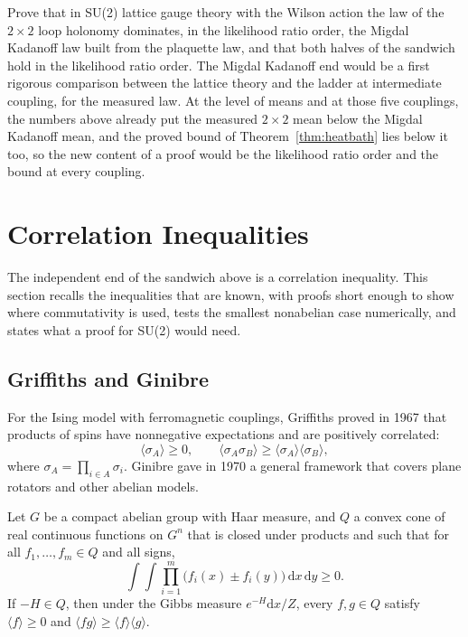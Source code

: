 \begin{problem}\label{op:ineq1}
Prove that in SU(2) lattice gauge theory with the Wilson action the law of the $2\times2$ loop holonomy dominates, in the likelihood ratio order, the Migdal Kadanoff law built from the plaquette law, and that both halves of the sandwich hold in the likelihood ratio order. The Migdal Kadanoff end would be a first rigorous comparison between the lattice theory and the ladder at intermediate coupling, for the measured law. At the level of means and at those five couplings, the numbers above already put the measured $2\times2$ mean below the Migdal Kadanoff mean, and the proved bound of Theorem~\ref{thm:heatbath} lies below it too, so the new content of a proof would be the likelihood ratio order and the bound at every coupling.
\end{problem}

\section{Correlation Inequalities}\label{ch:griffiths}

The independent end of the sandwich above is a correlation inequality. This section recalls the inequalities that are known, with proofs short enough to show where commutativity is used, tests the smallest nonabelian case numerically, and states what a proof for SU(2) would need.

\subsection{Griffiths and Ginibre}

For the Ising model with ferromagnetic couplings, Griffiths \cite{Gri67} proved in 1967 that products of spins have nonnegative expectations and are positively correlated:
\[
\langle\sigma_A\rangle\ge0,\qquad\langle\sigma_A\sigma_B\rangle\ge\langle\sigma_A\rangle\langle\sigma_B\rangle,
\]
where $\sigma_A=\prod_{i\in A}\sigma_i$. Ginibre \cite{Gi70} gave in 1970 a general framework that covers plane rotators and other abelian models.

\begin{theorem}[Ginibre]\label{thm:ginibre}
Let $G$ be a compact abelian group with Haar measure, and $Q$ a convex cone of real continuous functions on $G^n$ that is closed under products and such that for all $f_1,\dots,f_m\in Q$ and all signs,
\[
\int\!\!\int\prod_{i=1}^m\big(f_i(x)\pm f_i(y)\big)\,\mathrm dx\,\mathrm dy\ge0 .
\]
If $-H\in Q$, then under the Gibbs measure $e^{-H}\mathrm dx/Z$, every $f,g\in Q$ satisfy $\langle f\rangle\ge0$ and $\langle fg\rangle\ge\langle f\rangle\langle g\rangle$.
\end{theorem}

